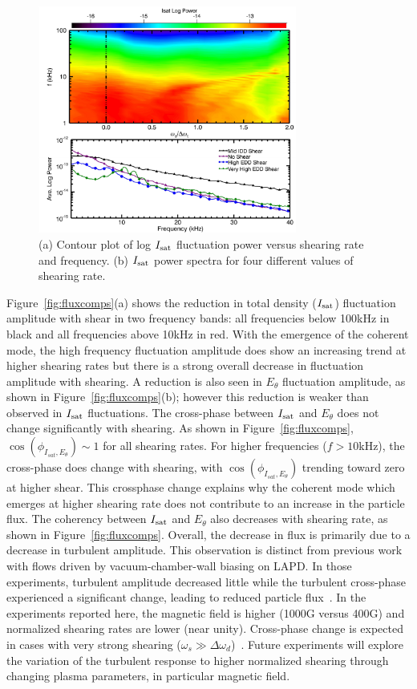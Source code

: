 \documentclass[aps,prl,amsmath,amssymb,preprint,superscriptaddress]{revtex4}
\begin{document}
\begin{figure}[!htbp]
\centerline{
\includegraphics[width=8.5cm]{powercontour.pdf}}
\caption{\label{fig:powercontour} (a) Contour plot of log $I_{\rm sat}$ fluctuation power versus shearing rate and frequency. (b) $I_{\rm sat}$ power spectra for four different values of shearing rate.}
\end{figure}

Figure~\ref{fig:fluxcomps}(a) shows the reduction in total density ($I_{\rm sat}$) fluctuation amplitude with shear in two frequency bands: all frequencies below 100kHz in black and all frequencies above 10kHz in red. With the emergence of the coherent mode, the
high frequency fluctuation amplitude does show an increasing trend at higher shearing
rates but there is a strong overall decrease in fluctuation amplitude with shearing.
A reduction is also seen in $E_\theta$ fluctuation amplitude, as shown in
Figure~\ref{fig:fluxcomps}(b); however this reduction is weaker than
observed in $I_{\rm sat}$ fluctuations.  The cross-phase between
$I_{\rm sat}$ and $E_\theta$ does not change significantly with
shearing. As shown in Figure~\ref{fig:fluxcomps},
$\cos(\phi_{I_{sat},E_\theta}) \sim 1$ for all shearing rates.  For
higher frequencies ($f > 10$kHz), the cross-phase does change with
shearing, with $\cos(\phi_{I_{sat},E_\theta})$ trending toward zero at
higher shear.  This crossphase change explains why the coherent mode
which emerges at higher shearing rate does not contribute to an
increase in the particle flux.  The coherency between $I_{\rm sat}$ and
$E_\theta$ also decreases with shearing rate, as shown in 
Figure~\ref{fig:fluxcomps}.  Overall, the decrease in flux is primarily
due to a decrease in turbulent amplitude.  This observation is distinct from previous work with flows driven by vacuum-chamber-wall
biasing on LAPD. In those experiments, turbulent amplitude decreased little while the
turbulent cross-phase experienced a significant change, leading to
reduced particle flux~\cite{carter09}.  In the experiments reported
here, the magnetic field is higher (1000G versus 400G) and normalized
shearing rates are lower (near unity).  Cross-phase change is expected
in cases with very strong shearing ($\omega_s \gg \Delta
\omega_d$)~\cite{terry01}.  Future experiments will explore the
variation of the turbulent response to higher normalized shearing
through changing plasma parameters, in particular magnetic field.  
\end{document}
